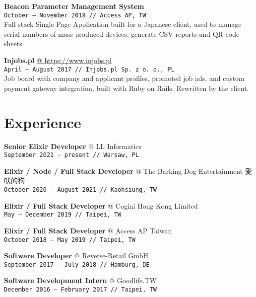 \documentclass[10pt,a4paper]{article}
\makeatletter
\newcommand{\project}[3]{\par\vspace{1em}\textbf{\normalsize #1}\\{\footnotesize\texttt{#2 // #3}}\\[4pt]}
\newcommand{\projectweb}[4]{\par\vspace{1em}\textbf{\normalsize #1} \href{#2}{\color{darkgray} @ #2}\\{\footnotesize\texttt{#3 // #4}}\\[4pt]}
\newcommand{\experience}[4]{\par\vspace{1em}\textbf{\normalsize #1} {\color{darkgray} @ #2}\\{\footnotesize\texttt{#3 // #4}}\\[4pt]}
\makeatother
\begin{document}
\begin{minipage}[t]{0.67\textwidth}
  \project{Beacon Parameter Management System}{October {–} November 2018}{Access AP, TW}

  \small
  Full stack Single-Page Application built for a Japanese client, used to manage serial numbers of mass-produced
  devices, generate CSV reports and QR code sheets.

  \projectweb{Injobs.pl}{https://www.injobs.pl}{April {–} August 2017}{Injobs.pl Sp. z o. o., PL}

  \small
  Job board with company and applicant profiles, promoted job ads, and custom payment gateway integration, built with Ruby on Rails. Rewritten by the client.

  \vspace{1.2em}
  \section{Experience}
  \vspace*{-6pt}

  \experience{Senior Elixir Developer}{LL Informatics}{September 2021 {-} present}{Warsaw, PL}

  \experience{Elixir / Node / Full Stack Developer}{The Barking Dog Entertainment 愛吠的狗}{October 2020 {-} August 2021}{Kaohsiung, TW}

  \experience{Elixir / Full Stack Developer}{Cogini Hong Kong Limited}{May {–} December 2019}{Taipei, TW}

  \experience{Elixir / Full Stack Developer}{Access AP Taiwan}{October 2018 {–} May 2019}{Taipei, TW}

  \experience{Software Developer}{Reverse-Retail GmbH}{September 2017 {–} July 2018}{Hamburg, DE}

  \experience{Software Development Intern}{Goodlife.TW}{December 2016 {–} February 2017}{Taipei, TW}

\end{minipage}\hspace{0.03\textwidth}%
\end{document}

